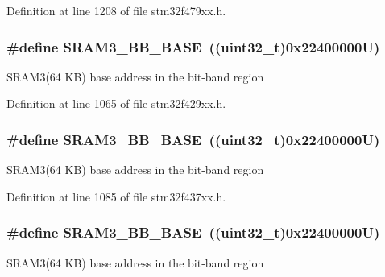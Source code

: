 Definition at line 1208 of file stm32f479xx.\+h.

\subsubsection[{\texorpdfstring{S\+R\+A\+M3\+\_\+\+B\+B\+\_\+\+B\+A\+SE}{SRAM3_BB_BASE}}]{\setlength{\rightskip}{0pt plus 5cm}\#define S\+R\+A\+M3\+\_\+\+B\+B\+\_\+\+B\+A\+SE~((uint32\+\_\+t)0x22400000\+U)}\hypertarget{group___peripheral__memory__map_gaebfa4db60f9ac39c7c7f3fed98090410}{}\label{group___peripheral__memory__map_gaebfa4db60f9ac39c7c7f3fed98090410}
S\+R\+A\+M3(64 K\+B) base address in the bit-\/band region 

Definition at line 1065 of file stm32f429xx.\+h.

\subsubsection[{\texorpdfstring{S\+R\+A\+M3\+\_\+\+B\+B\+\_\+\+B\+A\+SE}{SRAM3_BB_BASE}}]{\setlength{\rightskip}{0pt plus 5cm}\#define S\+R\+A\+M3\+\_\+\+B\+B\+\_\+\+B\+A\+SE~((uint32\+\_\+t)0x22400000\+U)}\hypertarget{group___peripheral__memory__map_gaebfa4db60f9ac39c7c7f3fed98090410}{}\label{group___peripheral__memory__map_gaebfa4db60f9ac39c7c7f3fed98090410}
S\+R\+A\+M3(64 K\+B) base address in the bit-\/band region 

Definition at line 1085 of file stm32f437xx.\+h.

\subsubsection[{\texorpdfstring{S\+R\+A\+M3\+\_\+\+B\+B\+\_\+\+B\+A\+SE}{SRAM3_BB_BASE}}]{\setlength{\rightskip}{0pt plus 5cm}\#define S\+R\+A\+M3\+\_\+\+B\+B\+\_\+\+B\+A\+SE~((uint32\+\_\+t)0x22400000\+U)}\hypertarget{group___peripheral__memory__map_gaebfa4db60f9ac39c7c7f3fed98090410}{}\label{group___peripheral__memory__map_gaebfa4db60f9ac39c7c7f3fed98090410}
S\+R\+A\+M3(64 K\+B) base address in the bit-\/band region 

